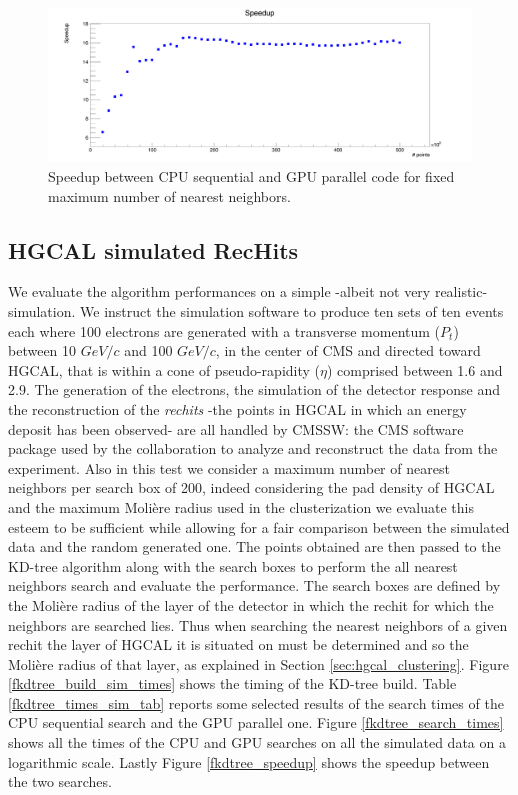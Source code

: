 \begin{figure}
\includegraphics[width=\textwidth]{fkdtree/fixed200/fkdSpeedup.png}
\caption{Speedup between CPU sequential and GPU parallel code for fixed maximum number of nearest neighbors.}
\label{fkdtree_times_fixedNN_speedup}
\end{figure}

\subsection{HGCAL simulated RecHits}

We evaluate the algorithm performances on a simple -albeit not very realistic- simulation.
We instruct the simulation software to produce ten sets of ten events each where 100 electrons are generated with a transverse momentum ($P_t$) between 10 $\unit{GeV/c}$ and 100 $\unit{GeV/c}$, in the center of CMS and directed toward HGCAL, that is within a cone of pseudo-rapidity ($\eta$) comprised between 1.6 and 2.9.
The generation of the electrons, the simulation of the detector response and the reconstruction of the \textit{rechits} -the points in HGCAL in which an energy deposit has been observed- are all handled by CMSSW: the CMS software package used by the collaboration to analyze and reconstruct the data from the experiment. Also in this test we consider a maximum number of nearest neighbors per search box of 200, indeed considering the pad density of HGCAL and the maximum Molière radius used in the clusterization we evaluate this esteem to be sufficient while allowing for a fair comparison between the simulated data and the random generated one.
The points obtained are then passed to the KD-tree algorithm along with the search boxes to perform the all nearest neighbors search and evaluate the performance. The search boxes are defined by the Molière radius of the layer of the detector in which the rechit for which the neighbors are searched lies. Thus when searching the nearest neighbors of a given rechit the layer of HGCAL it is situated on must be determined and so the Molière radius of that layer, as explained in Section \ref{sec:hgcal_clustering}.
Figure \ref{fkdtree_build_sim_times} shows the timing of the KD-tree build. Table \ref{fkdtree_times_sim_tab} reports some selected results of the search times of the CPU sequential search and the GPU parallel one. Figure \ref{fkdtree_search_times} shows all the times of the CPU and GPU searches on all the simulated data on a logarithmic scale. Lastly Figure \ref{fkdtree_speedup} shows the speedup between the two searches.\\

